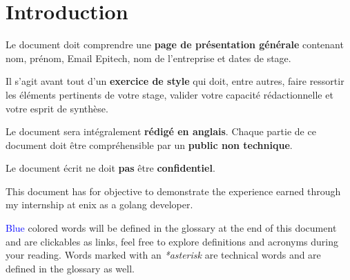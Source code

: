 \chapter{Introduction}

\color{red}
Le document doit comprendre une \textbf{page de présentation générale} contenant nom, prénom, Email Epitech, nom de l’entreprise et dates de stage.

Il s’agit avant tout d’un \textbf{exercice de style} qui doit, entre autres, faire ressortir les éléments
pertinents de votre stage, valider votre capacité rédactionnelle et votre esprit de synthèse.

Le document sera intégralement \textbf{rédigé en anglais}. Chaque partie de ce document doit être
compréhensible par un \textbf{public non technique}.

Le document écrit ne doit \textbf{pas} être \textbf{confidentiel}.
\color{black}

This document has for objective to demonstrate the experience earned through my internship at \gls{enix} as a golang developer.

\textcolor{blue}{Blue} colored words will be defined in the glossary at the end of this document and are clickables as links, feel free to explore definitions and acronyms during your reading. Words marked with an \emph{*asterisk} are technical words and are defined in the glossary as well.

\clearpage

